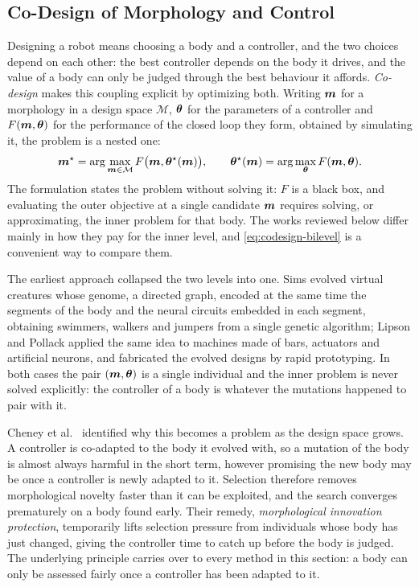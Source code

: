 \subsection{Co-Design of Morphology and Control}
\label{subsec:rw-codesign}

Designing a robot means choosing a body and a controller, and the two choices depend on each other: the best controller depends on the body it drives, and the value of a body can only be judged through the best behaviour it affords. \emph{Co-design} makes this coupling explicit by optimizing both. Writing $\bm{m}$ for a morphology in a design space $\mathcal{M}$, $\bm{\theta}$ for the parameters of a controller and $F(\bm{m}, \bm{\theta})$ for the performance of the closed loop they form, obtained by simulating it, the problem is a nested one:
\begin{equation}
\bm{m}^{\star} = \arg\max_{\bm{m} \in \mathcal{M}} F\big(\bm{m}, \bm{\theta}^{\star}(\bm{m})\big), \qquad \bm{\theta}^{\star}(\bm{m}) = \arg\max_{\bm{\theta}} F(\bm{m}, \bm{\theta}).
\label{eq:codesign-bilevel}
\end{equation}
The formulation states the problem without solving it: $F$ is a black box, and evaluating the outer objective at a single candidate $\bm{m}$ requires solving, or approximating, the inner problem for that body. The works reviewed below differ mainly in how they pay for the inner level, and \eqref{eq:codesign-bilevel} is a convenient way to compare them.

The earliest approach collapsed the two levels into one. Sims \cite{sims1994evolving} evolved virtual creatures whose genome, a directed graph, encoded at the same time the segments of the body and the neural circuits embedded in each segment, obtaining swimmers, walkers and jumpers from a single genetic algorithm; Lipson and Pollack \cite{lipson2000automatic} applied the same idea to machines made of bars, actuators and artificial neurons, and fabricated the evolved designs by rapid prototyping. In both cases the pair $(\bm{m}, \bm{\theta})$ is a single individual and the inner problem is never solved explicitly: the controller of a body is whatever the mutations happened to pair with it.

Cheney et al.\ \cite{cheney2018scalable} identified why this becomes a problem as the design space grows. A controller is co-adapted to the body it evolved with, so a mutation of the body is almost always harmful in the short term, however promising the new body may be once a controller is newly adapted to it. Selection therefore removes morphological novelty faster than it can be exploited, and the search converges prematurely on a body found early. Their remedy, \emph{morphological innovation protection}, temporarily lifts selection pressure from individuals whose body has just changed, giving the controller time to catch up before the body is judged. The underlying principle carries over to every method in this section: a body can only be assessed fairly once a controller has been adapted to it.

